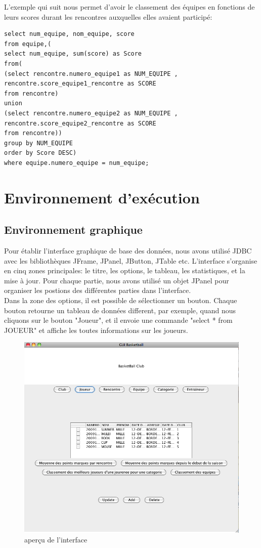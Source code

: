 \documentclass{article}
\begin{document}
L'exemple qui suit nous permet d'avoir le classement des équipes en fonctions de leurs scores durant les rencontres auxquelles elles avaient participé: \\

\begin{verbatim}
select num_equipe, nom_equipe, score
from equipe,(
select num_equipe, sum(score) as Score
from(
(select rencontre.numero_equipe1 as NUM_EQUIPE , rencontre.score_equipe1_rencontre as SCORE
from rencontre)
union
(select rencontre.numero_equipe2 as NUM_EQUIPE , rencontre.score_equipe2_rencontre as SCORE
from rencontre))
group by NUM_EQUIPE
order by Score DESC)
where equipe.numero_equipe = num_equipe;
\end{verbatim}

\newpage
\section{Environnement d'exécution}
\subsection{Environnement graphique}
Pour établir l'interface graphique de base des données, nous avons utilisé JDBC avec les bibliothèques JFrame, JPanel, JButton, JTable etc. L'interface s'organise en cinq zones principales: le titre, les options, le tableau, les statistiques, et la mise à jour. Pour chaque partie, nous avons utilisé un objet JPanel pour organiser les postions des différentes parties dans l'interface. \\

Dans la zone des options, il est possible de sélectionner un bouton. Chaque bouton retourne un tableau de données different, par exemple, quand nous cliquons sur le bouton "Joueur", et il envoie une commande "select * from JOUEUR" et affiche les toutes informations sur les joueurs. \\

\begin{figure}[!h]
\centering
\includegraphics[scale = 0.4] {1.png}
\caption{aperçu de l'interface}
\end{figure}
\end{document}
